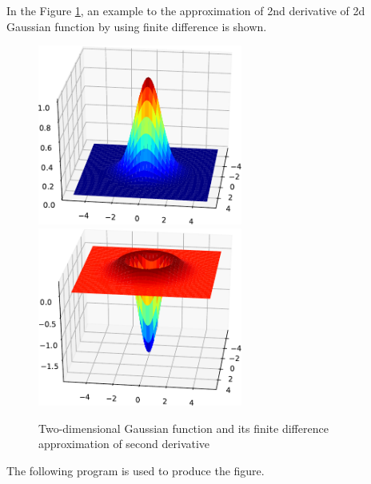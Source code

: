 In the Figure \ref{fig:fd_gaussian_2d}, an example to the approximation of 2nd derivative
of 2d Gaussian function by using finite difference is shown.

\begin{figure}[h]
{\center
\includegraphics[width=0.6\textwidth]{../codes/FD2d/IMG_gaussian2d.pdf}
\includegraphics[width=0.6\textwidth]{../codes/FD2d/IMG_d2_gaussian2d.pdf}
\par}
\caption{Two-dimensional Gaussian function and its finite difference
approximation of second derivative}
\label{fig:fd_gaussian_2d}
\end{figure}


The following program is used to produce the figure.

